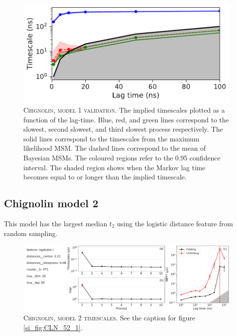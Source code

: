 \documentclass{article}
\begin{document}
\begin{figure}[h]
    \centering
    \includegraphics[height=0.15\textheight]{SI_figures/CLN_52_its.pdf}
    \caption{\textsc{Chignolin, model 1 validation}. The implied timescales plotted as a function of the lag-time. Blue, red, and green lines correspond to the slowest, second slowest, and third slowest process respectively. The solid lines correspond to the timescales from the maximum likelihood MSM. The dashed lines correspond to the mean of Bayesian MSMs. The coloured regions refer to the 0.95 confidence interval. The shaded region shows when the Markov lag time becomes equal to or longer than the implied timescale.}
    \label{si_fig:CLN_52_3}
\end{figure}

\FloatBarrier
\clearpage

\subsection{Chignolin model 2}

This model has the largest median $t_{2}$ using the logistic distance feature from random sampling.

\begin{figure}[h]
    \centering
    \includegraphics[width=\columnwidth]{SI_figures/CLN_23_SI1.pdf}
    \caption{\textsc{Chignolin,  model 2 timescales}.  See the caption for figure \ref{si_fig:CLN_52_1}. }
    \label{si_fig:CLN_24_1}
\end{figure}
\end{document}
